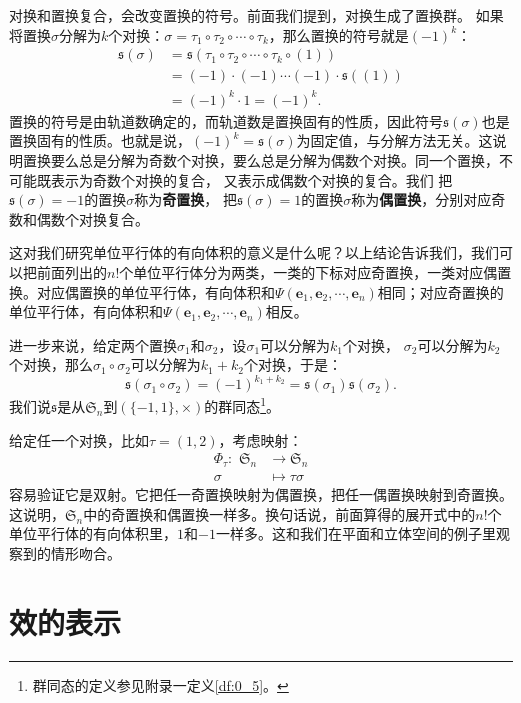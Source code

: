 \documentclass[12pt,UTF8]{ctexbook}
\begin{document}
对换和置换复合，会改变置换的符号。前面我们提到，对换生成了置换群。
如果将置换$\sigma$分解为$k$个对换：$\sigma = \tau_1 \circ \tau_2 \circ \cdots \circ \tau_k$，那么置换的符号就是$(-1)^k$：
\begin{align*}
    \mathfrak{s}(\sigma) &= \mathfrak{s}(\tau_1 \circ \tau_2 \circ \cdots \circ \tau_k \circ (1))  \\
    &= (-1) \cdot (-1) \cdots (-1) \cdot \mathfrak{s}((1))  \\
    &= (-1)^k \cdot 1 = (-1)^k.
\end{align*}
置换的符号是由轨道数确定的，而轨道数是置换固有的性质，因此符号$\mathfrak{s}(\sigma)$也是置换固有的性质。也就是说，$(-1)^k=\mathfrak{s}(\sigma)$为固定值，与分解方法无关。这说明置换要么总是分解为奇数个对换，要么总是分解为偶数个对换。同一个置换，不可能既表示为奇数个对换的复合，
又表示成偶数个对换的复合。我们
把$\mathfrak{s}(\sigma) = -1$的置换$\sigma$称为\textbf{奇置换}，
把$\mathfrak{s}(\sigma) = 1$的置换$\sigma$称为\textbf{偶置换}，分别对应奇数和偶数个对换复合。

这对我们研究单位平行体的有向体积的意义是什么呢？以上结论告诉我们，我们可以把前面列出的$n!$个单位平行体分为两类，一类的下标对应奇置换，一类对应偶置换。对应偶置换的单位平行体，有向体积和$\varPsi(\mathbf{e}_{1}, \mathbf{e}_{2},\cdots,\mathbf{e}_{n})$相同；对应奇置换的单位平行体，有向体积和$\varPsi(\mathbf{e}_{1}, \mathbf{e}_{2},\cdots,\mathbf{e}_{n})$相反。

进一步来说，给定两个置换$\sigma_1$和$\sigma_2$，设$\sigma_1$可以分解为$k_1$个对换，
$\sigma_2$可以分解为$k_2$个对换，那么$\sigma_1\circ\sigma_2$可以分解为$k_1+k_2$个对换，于是：
$$\mathfrak{s}(\sigma_1\circ\sigma_2) = (-1)^{k_1+k_2} = \mathfrak{s}(\sigma_1)\mathfrak{s}(\sigma_2).$$
我们说$\mathfrak{s}$是从$\mathfrak{S}_n$到$\left(\{-1,1\}, \times \right)$的群同态\footnote{群同态的定义参见附录一定义\ref{df:0_5}。}。

给定任一个对换，比如$\tau = (1,2)$，考虑映射：
\begin{align*}
    \Phi_\tau : \,\, \mathfrak{S}_n &\rightarrow \mathfrak{S}_n  \\
    \sigma &\mapsto \tau\sigma 
\end{align*} 
容易验证它是双射。它把任一奇置换映射为偶置换，把任一偶置换映射到奇置换。
这说明，$\mathfrak{S}_n$中的奇置换和偶置换一样多。换句话说，前面算得的展开式中的$n!$个单位平行体的有向体积里，$1$和$-1$一样多。这和我们在平面和立体空间的例子里观察到的情形吻合。

\section{效的表示}
\end{document}
